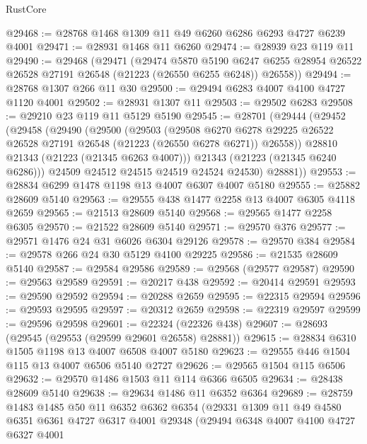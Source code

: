 \begin{lexlean}{RustCore}
\begin{coremodule}
@29468 := @28768 @1468 @1309 @11 @49 @6260 @6286 @6293 @4727 @6239 @4001
@29471 := @28931 @1468 @11 @6260
@29474 := @28939 @23 @119 @11
@29490 := @29468
    (@29471
      (@29474
        @5870
        @5190
        @6247
        @6255
        @28954
        @26522
        @26528
        @27191
        @26548
        (@21223 (@26550 @6255 @6248))
        @26558))
@29494 := @28768 @1307 @266 @11 @30
@29500 := @29494 @6283 @4007 @4100 @4727 @1120 @4001
@29502 := @28931 @1307 @11
@29503 := @29502 @6283
@29508 := @29210 @23 @119 @11 @5129 @5190
@29545 := @28701
    (@29444
      (@29452
        (@29458
          (@29490
            (@29500
              (@29503
                (@29508
                  @6270
                  @6278
                  @29225
                  @26522
                  @26528
                  @27191
                  @26548
                  (@21223 (@26550 @6278 @6271))
                  @26558))
              @28810
              @21343
              (@21223 (@21345 @6263 @4007)))
            @21343
            (@21223 (@21345 @6240 @6286)))
          @24509
          @24512
          @24515
          @24519
          @24524
          @24530)
        @28881))
@29553 := @28834 @6299 @1478 @1198 @13 @4007 @6307 @4007 @5180
@29555 := @25882 @28609 @5140
@29563 := @29555 @438 @1477 @2258 @13 @4007 @6305 @4118 @2659
@29565 := @21513 @28609 @5140
@29568 := @29565 @1477 @2258 @6305
@29570 := @21522 @28609 @5140
@29571 := @29570 @376
@29577 := @29571 @1476 @24 @31 @6026 @6304 @29126
@29578 := @29570 @384
@29584 := @29578 @266 @24 @30 @5129 @4100 @29225
@29586 := @21535 @28609 @5140
@29587 := @29584 @29586
@29589 := @29568 (@29577 @29587)
@29590 := @29563 @29589
@29591 := @20217 @438
@29592 := @20414 @29591
@29593 := @29590 @29592
@29594 := @20288 @2659
@29595 := @22315 @29594
@29596 := @29593 @29595
@29597 := @20312 @2659
@29598 := @22319 @29597
@29599 := @29596 @29598
@29601 := @22324 (@22326 @438)
@29607 := @28693 (@29545 (@29553 (@29599 @29601 @26558) @28881))
@29615 := @28834 @6310 @1505 @1198 @13 @4007 @6508 @4007 @5180
@29623 := @29555 @446 @1504 @115 @13 @4007 @6506 @5140 @2727
@29626 := @29565 @1504 @115 @6506
@29632 := @29570 @1486 @1503 @11 @114 @6366 @6505
@29634 := @28438 @28609 @5140
@29638 := @29634 @1486 @11 @6352 @6364
@29689 := @28759
    @1483
    @1485
    @50
    @11
    @6352
    @6362
    @6354
    (@29331
      @1309
      @11
      @49
      @4580
      @6351
      @6361
      @4727
      @6317
      @4001
      @29348
      (@29494
        @6348
        @4007
        @4100
        @4727
        @6327
        @4001

\end{coremodule}
\end{lexlean}
